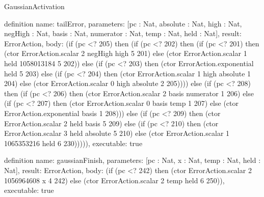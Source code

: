 \begin{lexlean}{GaussianActivation}
\begin{semanticmodule}
definition{
  name: tailError,
  parameters: [pc : Nat, absolute : Nat, high : Nat, negHigh : Nat, basis : Nat, numerator : Nat, temp : Nat, held : Nat],
  result: ErrorAction,
  body: (if (pc <? 205) then (if (pc <? 202) then (if (pc <? 201) then (ctor ErrorAction.scalar 2 negHigh high 5 201) else (ctor ErrorAction.scalar 1 held 1058013184 5 202)) else (if (pc <? 203) then (ctor ErrorAction.exponential held 5 203) else (if (pc <? 204) then (ctor ErrorAction.scalar 1 high absolute 1 204) else (ctor ErrorAction.scalar 0 high absolute 2 205)))) else (if (pc <? 208) then (if (pc <? 206) then (ctor ErrorAction.scalar 2 basis numerator 1 206) else (if (pc <? 207) then (ctor ErrorAction.scalar 0 basis temp 1 207) else (ctor ErrorAction.exponential basis 1 208))) else (if (pc <? 209) then (ctor ErrorAction.scalar 2 held basis 5 209) else (if (pc <? 210) then (ctor ErrorAction.scalar 3 held absolute 5 210) else (ctor ErrorAction.scalar 1 1065353216 held 6 230))))),
  executable: true
}

definition{
  name: gaussianFinish,
  parameters: [pc : Nat, x : Nat, temp : Nat, held : Nat],
  result: ErrorAction,
  body: (if (pc <? 242) then (ctor ErrorAction.scalar 2 1056964608 x 4 242) else (ctor ErrorAction.scalar 2 temp held 6 250)),
  executable: true
}


\end{semanticmodule}
\end{lexlean}
